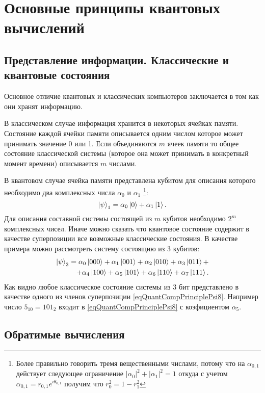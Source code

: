 \section{Основные принципы квантовых вычислений}

\subsection{Представление информации. Классические и квантовые
  состояния}
Основное отличие квантовых и классических компьютеров заключается в
том как они хранят информацию. 

В классическом случае информация хранится в некоторых ячейках
памяти. Состояние каждой ячейки памяти описывается одним числом
которое может принимать значение 0 или 1. Если объединяются $m$ ячеек
памяти то общее состояние классической системы (которое она может
принимать в конкретный момент времени) описывается $m$ числами.

В квантовом случае ячейка памяти представлена кубитом для описания
которого необходимо два комплексных числа $\alpha_0$ и $\alpha_1$
\footnote{Более правильно говорить тремя вещественными числами, потому
что на $\alpha_{0,1}$ действует следующее ограничение 
$\left|\alpha_0\right|^2 + \left|\alpha_1\right|^2 = 1$ откуда с
учетом $\alpha_{0,1} = r_{0,1}e^{i \theta_{0,1}}$ получим что $r_0^2 =
1 - r_1^2$}:
\[
\left|\psi\right>_1 = \alpha_0 \ket{ 0 } + \alpha_1 \ket{ 1 }.
\]
Для описания составной системы состоящей из $m$ кубитов необходимо
$2^m$ комплексных чисел. Иначе можно сказать что квантовое состояние
содержит в качестве суперпозиции все возможные классические
состояния. В качестве примера можно рассмотреть систему состоящию из 3
кубитов:
\begin{eqnarray}
\left|\psi\right>_3 = 
\alpha_0 \ket{ 000 } + 
\alpha_1 \ket{ 001 } + 
\alpha_2 \ket{ 010 } + 
\alpha_3 \ket{ 011 } + 
\nonumber \\
+ 
\alpha_4 \ket{ 100 } + 
\alpha_5 \ket{ 101 } + 
\alpha_6 \ket{ 110 } + 
\alpha_7 \ket{ 111 }.
\label{eqQuantCompPrinciplePsi8}
\end{eqnarray}
Как видно любое классическое состояние системы из 3 бит представлено в
качестве одного из членов суперпозиции
\eqref{eqQuantCompPrinciplePsi8}. Например число $5_{10}=101_2$ входит
в \eqref{eqQuantCompPrinciplePsi8} с коэфициентом $\alpha_5$.

\subsection{Обратимые вычисления}

